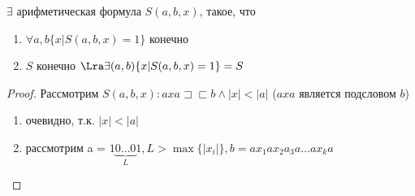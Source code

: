 \begin{proposition}
    \(\exists\) арифметическая формула \(S(a, b, x)\), такое, что
    \begin{enumerate}
        \item \(\forall a, b \{x | S(a, b, x) = 1\}\) конечно
        \item \(S\) конечно \(\Lra \exists (a, b) \{x | S(a, b, x) = 1\} = S\)
    \end{enumerate}
\end{proposition}
\begin{proof}
    Рассмотрим \(S(a, b, x): axa \sqsupset\sqsubset b \wedge |x| < |a|\) (\(axa\) является подсловом \(b\))
    \begin{enumerate}
        \item очевидно, т.к. \(|x| < |a|\)
        \item рассмотрим a = \(1\underbrace{0 \dots 0}_{L}1, L > \max \{|x_i|\}, b = ax_1ax_2a_3a\dots ax_ka\)
    \end{enumerate}
\end{proof}

